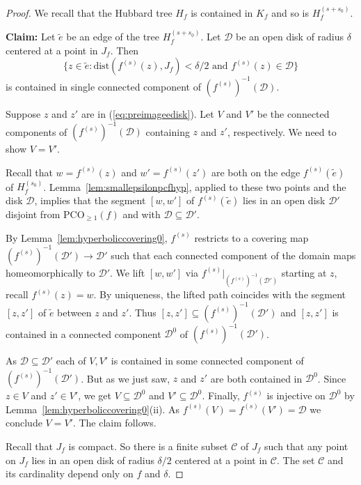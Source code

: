 \documentclass[12pt,oneside,a4]{amsart}
\renewcommand{\cD}{\mathcal{D}}
\numberwithin{maincounter}{section}
\numberwithin{equation}{section}
\renewcommand{\subset}{\subseteq}
\newcommand{\pco}{\mathrm{PCO}}
\begin{document}
\begin{proof}
  We recall that the Hubbard tree $H_f$ is contained in $K_f$ and so
  is $H_f^{(s+s_0)}$.
  
  \textbf{Claim:}
  Let $\tilde e$ be an edge of the tree $H_f^{(s+s_0)}$. Let $\cD$ be
  an open disk of radius $\delta$ centered at a point in $J_f$. Then
  \begin{equation}
    \label{eq:preimageedisk}
    \{z\in \tilde e
    : \mathrm{dist}(f^{(s)}(z),J_f)<\delta/2 \text{ and }f^{(s)}(z)\in
    \cD\}  
  \end{equation}
  is contained in single connected component of $(f^{(s)})^{-1}(\cD)$.
  
  Suppose $z$ and $z'$ are in (\ref{eq:preimageedisk}).
  Let $V$
  and $V'$ be the connected components
  of $(f^{(s)})^{-1}(\mathcal{D})$ containing $z$ and $z'$,
  respectively. We need to show $V=V'$.

  
  Recall that $w=f^{(s)}(z)$ and $w'=f^{(s)}(z')$ are both on the
  edge
  $f^{(s)}(\tilde e)$ of $H_f^{(s_0)}$.
  Lemma~\ref{lem:smallepsilonpcfhyp}, applied to these two points
  and the disk $\mathcal{D}$,  
  implies that the
  segment $[w,w']$ of $f^{(s)}(\tilde e)$ lies in an open disk $\mathcal{D}'$ disjoint
  from $\pco_{\ge 1}(f)$ and with
  $\mathcal{D}\subset \mathcal{D}'$.

  By Lemma~\ref{lem:hyperboliccovering0}, $f^{(s)}$ restricts to a covering map 
  $(f^{(s)})^{-1}(\mathcal{D}')\rightarrow \mathcal{D}'$ such that each connected
  component of the domain maps homeomorphically to $\mathcal{D}'$. 
  We lift $[w,w']$ via $f^{(s)}|_{(f^{(s)})^{-1}(\mathcal{D}')}$ starting at $z$, recall $f^{(s)}(z)=w$.
  By uniqueness, the lifted path coincides with the segment $[z,z']$ of $\tilde
  e$ between $z$ and $z'$. Thus $[z,z']\subset (f^{(s)})^{-1}(\mathcal{D}')$
  and $[z,z']$ is contained in a connected
  component $\mathcal{D}^0$ of $(f^{(s)})^{-1}(\mathcal{D}')$.
  
  As $\mathcal{D}\subset \mathcal{D}'$  each of $V,V'$ is
  contained in some connected component of  $(f^{(s)})^{-1}(\mathcal{D}')$.
  But as we just saw, $z$ and $z'$ are both contained in $\mathcal{D}^0$. Since
  $z\in V$ and $z'\in V'$, we get $V\subset \mathcal{D}^0$ and $V'\subset
  \mathcal{D}^0$. Finally, $f^{(s)}$ is injective on $\mathcal{D}^0$
  by Lemma~\ref{lem:hyperboliccovering0}(ii). As
  $f^{(s)}(V)=f^{(s)}(V')=\mathcal{D}$ we conclude
  $V=V'$.
  The claim follows.

  Recall that $J_f$ is compact.
  So there is a finite subset $\mathcal{C}$ of $J_f$ such
  that any point on $J_f$ lies in an open disk of radius $\delta/2$
  centered at a point in $\mathcal{C}$. The set $\mathcal{C}$ and its
  cardinality depend only on $f$ and $\delta$. 
 

\end{proof}
\end{document}
